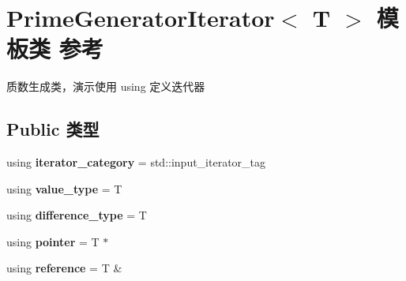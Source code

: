 \hypertarget{class_prime_generator_iterator}{}\section{Prime\+Generator\+Iterator$<$ T $>$ 模板类 参考}
\label{class_prime_generator_iterator}


质数生成类，演示使用 using 定义迭代器  


\subsection*{Public 类型}
\begin{DoxyCompactItemize}
\item 
\mbox{\label{class_prime_generator_iterator_aab0c89d430d2ca8a7c93e2d60a473740}} 
using {\bfseries iterator\+\_\+category} = std\+::input\+\_\+iterator\+\_\+tag
\item 
\mbox{\label{class_prime_generator_iterator_ac69c4c62883d1936201a67260f726deb}} 
using {\bfseries value\+\_\+type} = T
\item 
\mbox{\label{class_prime_generator_iterator_ab5333face446b3300db60a7e4a26333f}} 
using {\bfseries difference\+\_\+type} = T
\item 
\mbox{\label{class_prime_generator_iterator_a30092cbe6922fc32ce0d9e36606bb694}} 
using {\bfseries pointer} = T $\ast$
\item 
\mbox{\label{class_prime_generator_iterator_ac32fde043730a995d549659ab4923ec3}} 
using {\bfseries reference} = T \&
\end{DoxyCompactItemize}
